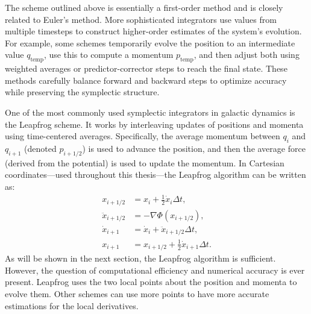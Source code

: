     The scheme outlined above is essentially a first-order method and is closely related to Euler's method. More sophisticated integrators use values from multiple timesteps to construct higher-order estimates of the system's evolution. For example, some schemes temporarily evolve the position to an intermediate value $q_\mathrm{temp}$, use this to compute a momentum $p_\mathrm{temp}$, and then adjust both using weighted averages or predictor-corrector steps to reach the final state. These methods carefully balance forward and backward steps to optimize accuracy while preserving the symplectic structure.

    One of the most commonly used symplectic integrators in galactic dynamics is the Leapfrog scheme. It works by interleaving updates of positions and momenta using time-centered averages. Specifically, the average momentum between $q_i$ and $q_{i+1}$ (denoted $p_{i+1/2}$) is used to advance the position, and then the average force (derived from the potential) is used to update the momentum. In Cartesian coordinates—used throughout this thesis—the Leapfrog algorithm can be written as:
    \begin{eqnarray}
        x_{i+1/2} &= x_i + \frac{1}{2} \dot{x}_i \Delta t , \\
        \ddot{x}_{i+1/2} &= -\nabla \Phi(x_{i+1/2}), \\
        \dot{x}_{i+1} &= \dot{x}_i + \ddot{x}_{i+1/2} \Delta t, \\
        x_{i+1} &= x_{i+1/2} + \frac{1}{2} \dot{x}_{i+1} \Delta t. 
    \end{eqnarray}
    As will be shown in the next section, the Leapfrog algorithm is sufficient. However, the question of computational efficiency and numerical accuracy is ever present. Leapfrog uses the two local points about the position and momenta to evolve them. Other schemes can use more points to have more accurate estimations for the local derivatives. 
    
